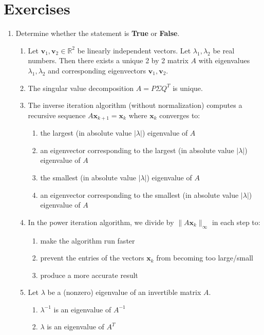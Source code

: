 \section{Exercises}

\begin{enumerate}[leftmargin=*]
\item Determine whether the statement is {\bf True} or {\bf False}.
\begin{enumerate}
\item Let $ \boldsymbol{v}_1 , \boldsymbol{v}_2 \in \mathbb{R}^2 $ be linearly independent vectors. Let $ \lambda_1 , \lambda_2 $ be real numbers. Then there exists a unique 2 by 2 matrix $ A $ with eigenvalues $ \lambda_1 , \lambda_2 $ and corresponding eigenvectors $ \boldsymbol{v}_1 , \boldsymbol{v}_2 $.
\item The singular value decomposition $A = P\Sigma Q^T$ is unique.
\item The inverse iteration algorithm (without normalization) computes a recursive sequence $ A \boldsymbol{x}_{k+1} = \boldsymbol{x}_k $ where $ \boldsymbol{x}_k $ converges to:
\begin{enumerate}
\item the largest (in absolute value $ | \lambda | $) eigenvalue of $ A $
\item an eigenvector corresponding to the largest (in absolute value $ | \lambda | $) eigenvalue of $ A $
\item the smallest (in absolute value $ | \lambda | $) eigenvalue of $ A $
\item an eigenvector corresponding to the smallest (in absolute value $ | \lambda | $) eigenvalue of $ A $
\end{enumerate}
\item In the power iteration algorithm, we divide by $ \| A \boldsymbol{x}_k \|_{\infty} $ in each step to:
\begin{enumerate}
\item make the algorithm run faster
\item prevent the entries of the vectors $ \boldsymbol{x}_k $ from becoming too large/small
\item produce a more accurate result
\end{enumerate}
\item Let $ \lambda $ be a (nonzero) eigenvalue of an invertible matrix $ A $.
\begin{enumerate}
\item $ \lambda^{-1} $ is an eigenvalue of $ A^{-1} $
\item $ \lambda $ is an eigenvalue of $ A^T $

\end{enumerate}
\end{enumerate}
\end{enumerate}
